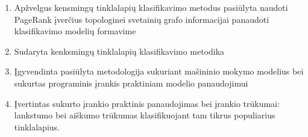 \documentclass[12pt, a4paper, onecolumn, titlepage, oneside, intlimits]{report}
\begin{document}







\begin{enumerate}[label=\arabic*.]
\item Apžvelgus kensmingų tinklalapių klasifikavimo metodus pasiūlyta naudoti PageRank įverčius topologinei svetainių grafo informacijai panaudoti klasifikavimo modelių formavime
\item Sudaryta kenksmingų tinklalapių klasifikavimo metodika
\item Įgyvendinta pasiūlyta metodologija sukuriant mašininio mokymo modelius bei sukurtas programinis įrankis praktiniam modelio panaudojimui
\item Įvertintas sukurto įrankio praktinis panaudojimas bei įrankio trūkumai: lankstumo bei aiškumo trūkumas klasifikuojant tam tikrus populiarius tinklalapius.
\end{enumerate}

\newpage

\begin{ktuliterature}
    \printbibliography{}
\end{ktuliterature}

\newpage

\begin{ktuappendices}
\label{priedas:executor}


\label{priedas:frontend}

\end{ktuappendices}
\end{document}
